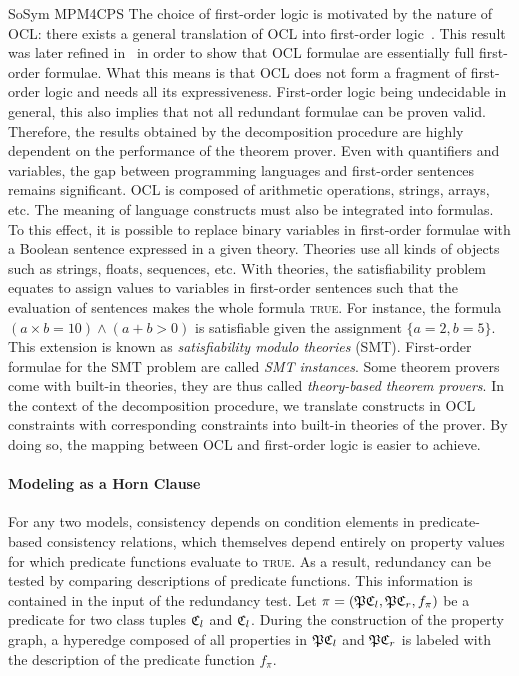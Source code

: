 \begin{copiedFrom}{SoSym MPM4CPS}
The choice of first-order logic is motivated by the nature of OCL: there exists a general translation of OCL into first-order logic~\cite{beckert2002ocltranslation}. This result was later refined in~\cite{berardi2005umlreasoning} in order to show that OCL formulae are essentially full first-order formulae. What this means is that OCL does not form a fragment of first-order logic and needs all its expressiveness. First-order logic being undecidable in general, this also implies that not all redundant formulae can be proven valid. Therefore, the results obtained by the decomposition procedure are highly dependent on the performance of the theorem prover. Even with quantifiers and variables, the gap between programming languages and first-order sentences remains significant. OCL is composed of arithmetic operations, strings, arrays, etc. The meaning of language constructs must also be integrated into formulas. To this effect, it is possible to replace binary variables in first-order formulae with a Boolean sentence expressed in a given theory. Theories use all kinds of objects such as strings, floats, sequences, etc. With theories, the satisfiability problem equates to assign values to variables in first-order sentences such that the evaluation of sentences makes the whole formula \textsc{true}. For instance, the formula $(a \times b = 10) \wedge (a + b > 0)$ is satisfiable given the assignment $\{a = 2, b = 5\}$.
This extension is known as \textit{satisfiability modulo theories} (SMT). First-order formulae for the SMT problem are called \textit{SMT instances}. Some theorem provers come with built-in theories, they are thus called \textit{theory-based theorem provers}. In the context of the decomposition procedure, we translate constructs in OCL constraints with corresponding constraints into built-in theories of the prover. By doing so, the mapping between OCL and first-order logic is easier to achieve. %

\paragraph{Modeling as a Horn Clause}

For any two models, consistency depends on condition elements in predicate-based consistency relations, which themselves depend entirely on property values for which predicate functions evaluate to \textsc{true}. As a result, redundancy can be tested by comparing descriptions of predicate functions. This information is contained in the input of the redundancy test. Let $\pi = (\mathfrak{P}{\mathfrak{C}_{l}}, \mathfrak{P}{\mathfrak{C}_{r}}, f_\pi)$ be a predicate for two class tuples $\mathfrak{C}_{l}$ and $\mathfrak{C}_{l}$. During the construction of the property graph, a hyperedge composed of all properties in $\mathfrak{P}{\mathfrak{C}_{l}}$ and $\mathfrak{P}{\mathfrak{C}_{r}}$ is labeled with the description of the predicate function $f_\pi$.


\end{copiedFrom}
